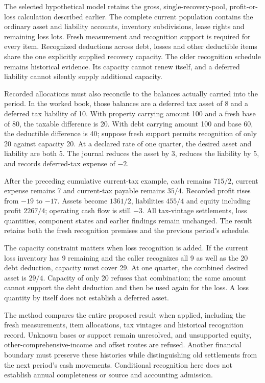 The selected hypothetical model retains the gross, single-recovery-pool,
profit-or-loss calculation described earlier. The complete current population
contains the ordinary asset and liability accounts, inventory subdivisions,
lease rights and remaining loss lots. Fresh measurement and recognition support
is required for every item. Recognized deductions across debt, losses and other
deductible items share the one explicitly supplied recovery capacity. The older
recognition schedule remains historical evidence. Its capacity cannot renew
itself, and a deferred liability cannot silently supply additional capacity.

Recorded allocations must also reconcile to the balances actually carried into
the period. In the worked book, those balances are a deferred tax asset of 8
and a deferred tax liability of 10. With property carrying amount 100 and a
fresh base of 80, the taxable difference is 20. With debt carrying amount 100
and base 60, the deductible difference is 40; suppose fresh support permits
recognition of only 20 against capacity 20. At a declared rate of one quarter,
the desired asset and liability are both 5. The journal reduces the asset by 3,
reduces the liability by 5, and records deferred-tax expense of $-2$.

After the preceding cumulative current-tax example, cash remains $715/2$,
current expense remains 7 and current-tax payable remains $35/4$. Recorded
profit rises from $-19$ to $-17$. Assets become $1361/2$, liabilities $455/4$
and equity including profit $2267/4$; operating cash flow is still $-3$.
All tax-vintage settlements, loss quantities, component states and earlier
findings remain unchanged. The result retains both the fresh recognition
premises and the previous period's schedule.

The capacity constraint matters when loss recognition is added. If the current
loss inventory has 9 remaining and the caller recognizes all 9 as well as the
20 debt deduction, capacity must cover 29. At one quarter, the combined desired
asset is $29/4$. Capacity of only 20 refuses that combination; the same amount
cannot support the debt deduction and then be used again for the loss. A loss
quantity by itself does not establish a deferred asset.

The method compares the entire proposed result when applied, including the
fresh measurements, item allocations, tax vintages and historical recognition
record. Unknown bases or support remain unresolved, and unsupported equity,
other-comprehensive-income and offset routes are refused. Another financial
boundary must preserve these histories while distinguishing old settlements
from the next period's cash movements. Conditional recognition here does not
establish annual completeness or source and accounting admission.


